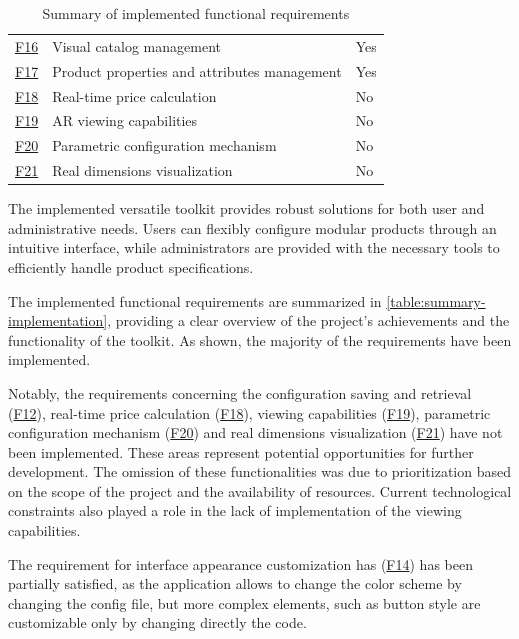 \begin{table}[htb]
\begin{tabular}{>{\raggedright\arraybackslash}p{0.5cm} >{\raggedright\arraybackslash}p{8cm} >{\centering\arraybackslash}p{2cm}}
\hyperref[itm:F16]{F16} & Visual catalog management &
    Yes \\
\hyperref[itm:F17]{F17} & Product properties and attributes management &
    Yes \\
\hyperref[itm:F18]{F18} & Real-time price calculation &
    No \\
\hyperref[itm:F19]{F19} & AR viewing capabilities &
    No \\
\hyperref[itm:F20]{F20} & Parametric configuration mechanism &
    No \\
\hyperref[itm:F21]{F21} & Real dimensions visualization &
    No \\
\bottomrule
\end{tabular}
\caption{Summary of implemented functional requirements}
\label{table:summary-implementation}
\end{table}


The implemented versatile toolkit provides robust solutions for both user and administrative needs. Users can flexibly configure modular products through an intuitive interface, while administrators are provided with the necessary tools to efficiently handle product specifications.

The implemented functional requirements are summarized in \autoref{table:summary-implementation}, providing a clear overview of the project's achievements and the functionality of the toolkit. As shown, the majority of the requirements have been implemented.

Notably, the requirements concerning the configuration saving and retrieval (\hyperref[itm:F12]{F12}), real-time price calculation (\hyperref[itm:F18]{F18}),  viewing capabilities (\hyperref[itm:F19]{F19}), parametric configuration mechanism (\hyperref[itm:F20]{F20}) and real dimensions visualization (\hyperref[itm:F21]{F21}) have not been implemented. These areas represent potential opportunities for further development. The omission of these functionalities was due to prioritization based on the scope of the project and the availability of resources. Current technological constraints also played a role in the lack of implementation of the  viewing capabilities.

The requirement for interface appearance customization has (\hyperref[itm:F14]{F14}) has been partially satisfied, as the application allows to change the color scheme by changing the config file, but more complex elements, such as button style are customizable only by changing directly the  code.

